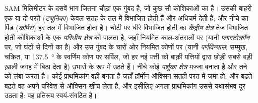 \begin{proposition}[प्ररोह शीर्ष]\label{prop:b2:plant-meristems:sam}
SAM मिलिमीटर के दसवें भाग जितना चौड़ा एक गुंबद है, जो कुछ सौ
कोशिकाओं का है। उसकी बाहरी एक या दो परतें (\emph{ट्यूनिका}) केवल
सतह के तल में विभाजित होती हैं और अधिचर्म देती हैं; और नीचे का पिंड
(\emph{कॉर्पस}) हर तल में विभाजित होता है। चोटी पर धीरे विभाजित होती
 का \emph{केंद्रीय क्षेत्र} तेज़ विभाजित होती कोशिकाओं के
एक \emph{परिधीय क्षेत्र} को पालता है, जहाँ \emph{} नियमित काल-अंतरालों पर (यानी
\emph{प्लास्टोक्रॉन} पर, जो घंटों से दिनों का है) और उस गुंबद के चारों
ओर नियमित कोणों पर (यानी \emph{पर्णविन्यास}: सम्मुख, चक्रित, या
\qty{137.5}{\degree} के स्वर्णिम कोण पर सर्पिल, जो हर नई पत्ती को बाक़ी
पत्तियों द्वारा छोड़ी सबसे बड़ी ख़ाली जगह में बिठा देता है) उभारों के रूप
में उठते हैं। नीचे कोई \emph{पर्शुका क्षेत्र} मज्जा बनाता है
और तने को लंबा करता है। कोई प्राथमिकांग वहीं बनता है जहाँ हॉर्मोन ऑक्सिन
सतही परत में जमा हो, और बढ़ते-बढ़ते वह अपने परिवेश से ऑक्सिन खींच लेता
है, और इसीलिए अगला प्राथमिकांग उससे यथासंभव दूर उठता है: वह प्रतिरूप
स्वयं-संगठित है।
\end{proposition}

